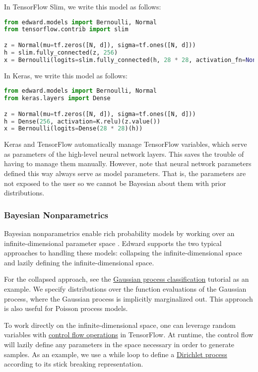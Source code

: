 In TensorFlow Slim, we write this model as follows:

\begin{lstlisting}[language=python]
from edward.models import Bernoulli, Normal
from tensorflow.contrib import slim

z = Normal(mu=tf.zeros([N, d]), sigma=tf.ones([N, d]))
h = slim.fully_connected(z, 256)
x = Bernoulli(logits=slim.fully_connected(h, 28 * 28, activation_fn=None))
\end{lstlisting}

In Keras, we write this model as follows:

\begin{lstlisting}[language=python]
from edward.models import Bernoulli, Normal
from keras.layers import Dense

z = Normal(mu=tf.zeros([N, d]), sigma=tf.ones([N, d]))
h = Dense(256, activation=K.relu)(z.value())
x = Bernoulli(logits=Dense(28 * 28)(h))
\end{lstlisting}

Keras and TensorFlow automatically manage TensorFlow variables, which
serve as parameters of the high-level neural network layers. This
saves the trouble of having to manage them manually. However, note
that neural network parameters defined this way always serve as model
parameters. That is, the parameters are not exposed to the user so we
cannot be Bayesian about them with prior distributions.

\subsubsection{Bayesian Nonparametrics}

Bayesian nonparametrics enable rich probability models by working over
an infinite-dimensional parameter space \citep{hjort2010bayesian}.
Edward supports the two typical approaches to handling these models:
collapsing the infinite-dimensional space and lazily defining the
infinite-dimensional space.

For the collapsed approach, see the
\href{/tutorials/gp-classification}{Gaussian process classification}
tutorial as an example. We specify distributions over the function
evaluations of the Gaussian process, where the Gaussian process is
implicitly marginalized out. This approach is also useful for Poisson
process models.

To work directly on the infinite-dimensional space, one can leverage
random variables with
\href{https://www.tensorflow.org/versions/master/api_docs/python/control_flow_ops.html}{control flow operations}
in TensorFlow. At runtime, the control flow will lazily define any
parameters in the space necessary in order to generate samples. As an
example, we use a while loop to
define a
\href{https://github.com/blei-lab/edward/blob/master/examples/pp_dirichlet_process.py}
{Dirichlet process} according to its stick breaking representation.

